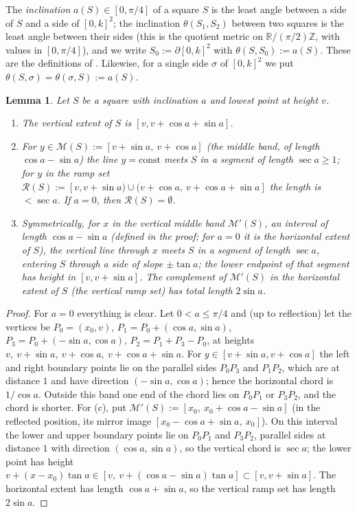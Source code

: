 \documentclass[11pt]{amsart}
\newtheorem{lemma}[theorem]{Lemma}
\theoremstyle{definition}
\theoremstyle{remark}
\newcommand{\R}{\mathbb{R}}
\newcommand{\Z}{\mathbb{Z}}
\begin{document}
The \emph{inclination} $a(S)\in[0,\pi/4]$ of a square $S$ is the least angle between a side of $S$ and a side of
$[0,k]^2$; the inclination $\theta(S_1,S_2)$ between two squares is the least angle between their sides
(this is the quotient metric on $\R/(\pi/2)\Z$, with values in $[0,\pi/4]$), and we write $S_0:=\partial[0,k]^2$ with
$\theta(S,S_0):=a(S)$. These are the definitions of \cite{RV}. Likewise, for a single side $\sigma$ of $[0,k]^2$ we put
$\theta(S,\sigma)=\theta(\sigma,S):=a(S)$.

\begin{lemma}\label{lem:geom}
Let $S$ be a square with inclination $a$ and lowest point at height $v$.
\begin{enumerate}[label=(\alph*)]
\item The vertical extent of $S$ is $[v,v+\cos a+\sin a]$.
\item For $y\in\mathcal M(S):=[v+\sin a,\ v+\cos a]$ (the \emph{middle band}, of length $\cos a-\sin a$) the line
$y=\mathrm{const}$ meets $S$ in a segment of length $\sec a\ge 1$; for $y$ in the \emph{ramp set}
$\mathcal R(S):=[v,v+\sin a)\cup(v+\cos a,\ v+\cos a+\sin a]$ the length is $<\sec a$. If $a=0$, then $\mathcal R(S)=\emptyset$.
\item Symmetrically, for $x$ in the \emph{vertical middle band} $\mathcal M'(S)$, an interval of length
$\cos a-\sin a$ \textup{(}defined in the proof; for $a=0$ it is the horizontal extent of $S$\textup{)}, the vertical line through $x$ meets $S$ in a segment of length $\sec a$, entering $S$ through a
side of slope $\pm\tan a$; the lower endpoint of that segment has height in $[v,v+\sin a]$. The complement of
$\mathcal M'(S)$ in the horizontal extent of $S$ (the \emph{vertical ramp set}) has total length $2\sin a$.
\end{enumerate}
\end{lemma}

\begin{proof}
For $a=0$ everything is clear. Let $0<a\le\pi/4$ and (up to reflection) let the vertices be
$P_0=(x_0,v)$, $P_1=P_0+(\cos a,\sin a)$, $P_3=P_0+(-\sin a,\cos a)$, $P_2=P_1+P_3-P_0$, at heights
$v,\ v+\sin a,\ v+\cos a,\ v+\cos a+\sin a$. For $y\in[v+\sin a,v+\cos a]$ the left and right boundary points lie on
the parallel sides $P_0P_3$ and $P_1P_2$, which are at distance $1$ and have direction $(-\sin a,\cos a)$; hence the
horizontal chord is $1/\cos a$. Outside this band one end of the chord lies on $P_0P_1$ or $P_3P_2$, and the chord is
shorter. For (c), put $\mathcal M'(S):=[x_0,\ x_0+\cos a-\sin a]$ (in the reflected position, its mirror image
$[x_0-\cos a+\sin a,\ x_0]$). On this interval the lower and upper boundary points lie on $P_0P_1$ and $P_3P_2$,
parallel sides at distance $1$ with direction $(\cos a,\sin a)$, so the vertical chord is $\sec a$; the lower point
has height $v+(x-x_0)\tan a\in[v,\ v+(\cos a-\sin a)\tan a]\subset[v,v+\sin a]$. The horizontal extent has length
$\cos a+\sin a$, so the vertical ramp set has length $2\sin a$.
\end{proof}
\end{document}
